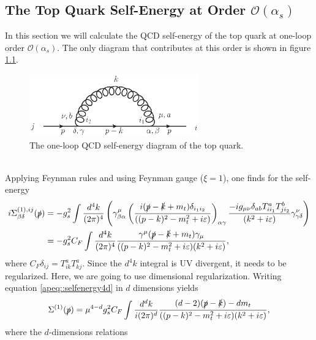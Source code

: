 \documentclass[a4paper,12pt]{book}
\begin{document}
\begin{appendices}
\chapter{The Top Quark Self-Energy at Order $\mathcal{O}(\alpha_s)$}
\label{ap::selfenergy}
In this section we will calculate the QCD self-energy of the top quark at one-loop order $\mathcal{O}(\alpha_s)$. The only diagram that contributes at this order is shown in figure \ref{fig::qcd1Lselfenergyfull}.
\begin{figure}[h]
\begin{center}
\includegraphics[width=0.65\textwidth]{src/feynman/qcd1Lselfenergyfull.ps}
\caption{The one-loop QCD self-energy diagram of the top quark.}
\label{fig::qcd1Lselfenergyfull}
\end{center}
\end{figure}\\
Applying Feynman rules and using Feynman gauge ($\xi = 1$), one finds for the self-energy
\begin{align}
i \Sigma^{(1),ij}_{\beta\delta}(\slashed{p})&= -g_s^2 \int \frac{d^4k}{(2\pi)^4} \left(\gamma^{\mu}_{\beta\alpha} \left(\frac{i (\slashed{p}-\slashed{k}+m_t)\delta_{i_1 i_2}}{((p-k)^2-m_t^2+i\varepsilon)}\right)_{\alpha\gamma} \frac{-ig_{\mu\nu}\delta_{ab} T^a_{ii_1}T^b_{ji_2}}{(k^2 + i\varepsilon)} \gamma^{\nu}_{\gamma\delta}\right)\\
\label{apeq::selfenergy4d}
&=-g_s^2 C_F \int \frac{d^4k}{(2\pi)^4} \frac{\gamma^{\mu}(\slashed{p}-\slashed{k}+m_t)\gamma_{\mu}}{((p-k)^2-m_t^2+i\varepsilon) (k^2+i\varepsilon)},
\end{align}
where $C_F \delta_{ij} = T^a_{ik}T^a_{kj}$. Since the $d^4k$ integral is UV divergent, it needs to be regularized. Here, we are going to use dimensional regularization. Writing equation \eqref{apeq::selfenergy4d} in $d$ dimensions yields
\begin{equation}
\Sigma^{(1)}(\slashed{p})=\mu^{4-d}g_s^2 C_F \int \frac{d^dk}{i(2\pi)^d} \frac{(d-2)(\slashed{p}-\slashed{k})-d m_t}{((p-k)^2-m_t^2+i\varepsilon) (k^2+i\varepsilon)},
\end{equation}  
where the $d$-dimensions relations 

\end{appendices}
\end{document}
